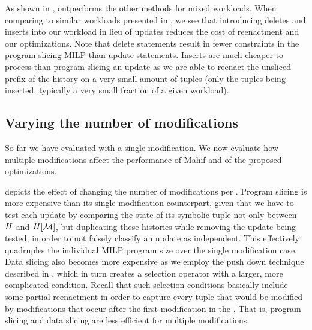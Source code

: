 As shown in , \mrdp outperforms the other methods for mixed workloads. When comparing to similar workloads presented in , we see that introducing deletes and inserts into our workload in lieu of updates reduces the cost of reenactment and our optimizations. Note that delete statements result in fewer constraints in the program slicing MILP than update statements. Inserts are much cheaper to process than program slicing an update as we are able to reenact the unsliced prefix of the history on a very small amount of tuples (only the tuples being inserted, typically a very small fraction of a given workload).

\subsection{Varying the number of modifications}\label{sec:vary-numb-modif}
So far we have evaluated \abbrHWs with a single modification. We now evaluate how multiple modifications affect the performance of Mahif and of the proposed optimizations.

 depicts the effect of changing the number of modifications per \abbrHW. Program slicing is more expensive than its single modification counterpart, given that we have to test each update by comparing the state of its symbolic tuple not only between $H$ and $H[\mathcal{M}]$, but duplicating these histories while removing the update being tested, in order to not falsely classify an update as independent. This effectively quadruples the individual MILP program size over the single modification case. Data slicing also becomes more expensive as we employ the push down technique described in , which in turn creates a selection operator with a  larger, more complicated condition. Recall that such selection conditions basically include some partial reenactment in order to capture every tuple that would be modified by modifications that occur after the first modification in the \abbrHW. That is, program slicing and data slicing are less efficient for multiple modifications.

